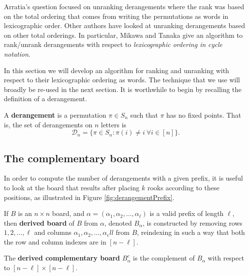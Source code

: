Arratia's question focused on unranking derangements where the rank was
based on the total ordering that comes from writing the
permutations as words in lexicographic order.
Other authors have looked at unranking derangements based on other total
orderings. In particular, Mikawa and Tanaka \cite{Mikawa2014} give an algorithm
to rank/unrank derangements
with respect to \textit{lexicographic ordering in cycle notation}.

In this section we will develop an algorithm for ranking and unranking with
respect to their lexicographic ordering as words. The technique that we use will
broadly be re-used in the next section.
It is worthwhile to begin by recalling the definition of a derangement.
\begin{definition}
  A \textbf{derangement} is a permutation $\pi \in S_n$ such that $\pi$ has no
  fixed points. That is, the set of derangements on $n$ letters is \[
    \mathcal{D}_n = \{\pi \in S_n : \pi(i) \neq i\ \forall i \in [n]\}.
  \]
\end{definition}

\subsection{The complementary board}
In order to compute the number of derangements with a given prefix, it is
useful to look at the board that results after placing $k$ rooks according to
these positions, as illustrated in Figure \ref{fig:derangementPrefix}.



\begin{definition}
  If $B$ is an $n \times n$ board, and
  $\alpha = (\alpha_1, \alpha_2, \dots, \alpha_\ell)$ is a valid prefix of length
  $\ell$, then \textbf{derived board} of $B$ from $\alpha$,
  denoted $B_\alpha$,
  is constructed by removing
  rows $1, 2, \dots, \ell$ and
  columns $\alpha_1, \alpha_2, \dots, \alpha_ell$ from $B$,
  reindexing in such a way that both the row and column indexes are in
  $[n - \ell]$.

  The \textbf{derived complementary board} $B_\alpha^c$ is the complement of
  $B_\alpha$ with respect to $[n - \ell] \times [n - \ell]$.
\end{definition}

